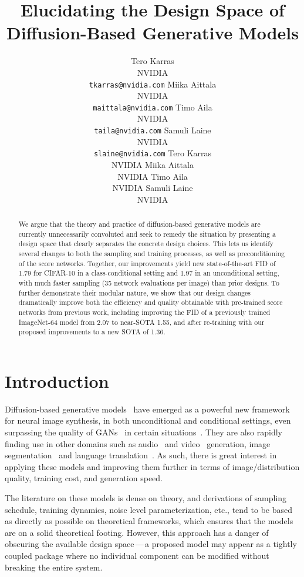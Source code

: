 \documentclass{article}
\title{Elucidating the Design Space of Diffusion-Based Generative Models}
\author{
  \ifemail
    Tero Karras   \\ NVIDIA \\ \texttt{tkarras@nvidia.com}  \And
    Miika Aittala \\ NVIDIA \\ \texttt{maittala@nvidia.com} \AND
    Timo Aila     \\ NVIDIA \\ \texttt{taila@nvidia.com}    \And
    Samuli Laine  \\ NVIDIA \\ \texttt{slaine@nvidia.com}
  \else
    Tero Karras   \\ NVIDIA \And
    Miika Aittala \\ NVIDIA \And
    Timo Aila     \\ NVIDIA \And
    Samuli Laine  \\ NVIDIA
  \fi
}
\newcommand{\confnotice}{}
\begin{document}
\maketitle
\confnotice

\begin{abstract}
We argue that the theory and practice of diffusion-based generative models are currently unnecessarily convoluted and seek to remedy the situation by presenting a design space that clearly separates the concrete design choices.
This lets us identify several changes to both the sampling and training processes, as well as preconditioning of the score networks.
Together, our improvements yield new state-of-the-art FID of 1.79 for CIFAR-10 in a class-conditional setting and 1.97 in an unconditional setting, with much faster sampling (35 network evaluations per image) than prior designs.
To further demonstrate their modular nature, we show that our design changes dramatically improve both the efficiency and quality obtainable with pre-trained score networks from previous work, including improving the FID of {a previously trained} ImageNet-64 model from 2.07 to near-SOTA 1.55,
{and after re-training with our proposed improvements to a new SOTA of 1.36.}
\end{abstract}

\section{Introduction}

Diffusion-based generative models~{\cite{SohlDickstein2015}} have emerged as a powerful new framework for neural image synthesis, in both unconditional \cite{Ho2020,Nichol2021a,Song2021sde} and conditional \cite{Ho2021cascaded,Nichol2021b,Nichol2021a,Preechakul2021diffusion,Ramesh2022,Rombach2021highresolution,Saharia2021,Song2021sde} settings,
  even surpassing the quality of GANs~\cite{Goodfellow2014} in certain situations~\cite{Dhariwal2021}.
They are also rapidly finding use in other domains such as audio~\cite{Kong2021,Popov2021} and video~\cite{Ho2022} generation, image segmentation~\cite{Baranchuk2022,Wolleb2022} and language translation~\cite{Nachmani2021}.
As such, there is great interest in applying these models and improving them further in terms of image/distribution quality, training cost, and generation speed.

The literature on these models is dense on theory, and %
derivations of sampling schedule, training dynamics, noise level parameterization, etc., tend to be based as directly as possible on theoretical frameworks, which ensures that the models are on a solid theoretical footing.
However, this approach has a danger of obscuring the available design space\,---\,a proposed model may appear as a tightly coupled package where no individual component can be modified without breaking the entire system.
\end{document}
